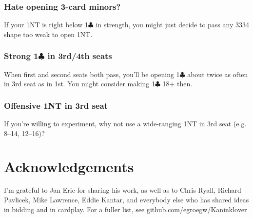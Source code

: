 \documentclass[a4paper, twoside, 11pt]{article}
\begin{document}
\begin{multicols}{3}
\subsubsection*{Hate opening 3-card minors?}
If your 1NT is right below 1$\clubsuit$ in strength, you might just decide to pass any 3334 shape too weak to open 1NT.

\subsubsection*{Strong 1$\clubsuit$ in 3rd/4th seats}
When first and second seats both pass, you'll be opening 1$\clubsuit$ about twice as often in 3rd seat as in 1st. You might consider making 1$\clubsuit$ 18+ then.

\subsubsection*{Offensive 1NT in 3rd seat}
If you're willing to experiment, why not use a wide-ranging 1NT in 3rd seat (e.g. 8--14, 12--16)?

\section{Acknowledgements}
I'm grateful to Jan Eric for sharing his work, as well as to Chris Ryall, Richard Pavlicek, Mike Lawrence, Eddie Kantar, and everybody else who has shared ideas in bidding and in cardplay. For a fuller list, see github.com/egroegw/Kaninklover

\end{multicols}
\end{document}
